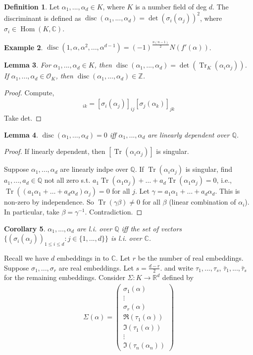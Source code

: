 \documentclass{article}
\theoremstyle{definition}
\newtheorem{defn}{Definition}[section]
\newtheorem{example}[defn]{Example}
\theoremstyle{remark}
\theoremstyle{plain}
\newtheorem{lem}[defn]{Lemma}
\newtheorem{crly}[defn]{Corollary}
\newcommand{\ZZ}{\mathbb{Z}}
\newcommand{\QQ}{\mathbb{Q}}
\newcommand{\RR}{\mathbb{R}}
\newcommand{\CC}{\mathbb{C}}
\newcommand{\Hom}{\operatorname{Hom}}
\newcommand{\tr}{\operatorname{Tr}}
\newcommand{\disc}{\operatorname{disc}}
\begin{document}
\begin{defn}
    Let $\alpha_1,...,\alpha_d\in K$, where $K$ is a number field of deg $d$. The discriminant is defined as $\disc(\alpha_1,...,\alpha_d)=\det(\sigma_i(\alpha_j))^2$, where $\sigma_i\in\Hom(K,\CC)$.
\end{defn}
\begin{example}
    $\disc(1,\alpha,\alpha^2,...,\alpha^{d-1})=(-1)^{\frac{n(n-1)}{2}}N(f'(\alpha))$.
\end{example}
\begin{lem}
    For $\alpha_1,...,\alpha_d\in K$, then
    $\disc(\alpha_1,...,\alpha_d)=\det(\tr_K(\alpha_i\alpha_j))$. If $\alpha_1,...,\alpha_d\in\mathcal O_K$, then $\disc(\alpha_1,...,\alpha_d)\in\ZZ$.
\end{lem}
\begin{proof}
    Compute,
    \begin{align*}
        [\tr(\alpha_i\alpha_k)]_{ik}=[\sigma_i(\alpha_j)]_{ij}[\sigma_{j}(\alpha_k)]_{jk}
    \end{align*}
    Take det.
\end{proof}
\begin{lem}
    $\disc(\alpha_1,...,\alpha_d)=0$ iff $\alpha_1,...,\alpha_d$ are linearly dependent over $\QQ$.
\end{lem}
\begin{proof}
    If linearly dependent, then $[\tr(\alpha_i\alpha_j)]$ is singular. 
    
    Suppose $\alpha_1,...,\alpha_d$ are linearly indpe over $\QQ$. If $\tr(\alpha_i\alpha_j)$ is singular, find $a_1,...,a_d\in\QQ$ not all zero s.t. $a_1\tr(\alpha_1\alpha_j)+\ldots+a_d\tr(\alpha_1\alpha_j)=0$, i.e., $\tr((a_1\alpha_1+\ldots+a_d\alpha_d)\alpha_j)=0$ for all $j$. Let $\gamma=a_1\alpha_1+\ldots+a_d\alpha_d$. This is non-zero by independence. So $\tr(\gamma\beta)\neq 0$ for all $\beta$ (linear combination of $\alpha_i$). In particular, take $\beta=\gamma^{-1}$. Contradiction.
\end{proof}
\begin{crly}
    $\alpha_1,...,\alpha_d$ are l.i. over $\QQ$ iff the set of vectors $\{(\sigma_i(\alpha_j))_{1\le i\le d}:j\in\{1,...,d\}\}$ is l.i. over $\CC$.
\end{crly}
Recall we have $d$ embeddings in to $\CC$. Let $r$ be the number of real embeddings. Suppose $\sigma_1,...,\sigma_r$ are real embeddings. Let $s=\frac{d-r}{2}$. and write $\tau_1,...,\tau_s$, $\bar\tau_1,...,\bar\tau_s$ for the remaining embeddings. Consider $\Sigma:K\to\RR^d$ defined by
\begin{align*}
    \Sigma(\alpha)=\begin{pmatrix}
        \sigma_1(\alpha)\\ \vdots\\ \sigma_r(\alpha)\\ \Re(\tau_1(\alpha))\\ \Im(\tau_1(\alpha))\\\vdots\\ \Im(\tau_n(\alpha_n))
    \end{pmatrix}
\end{align*}
\end{document}
